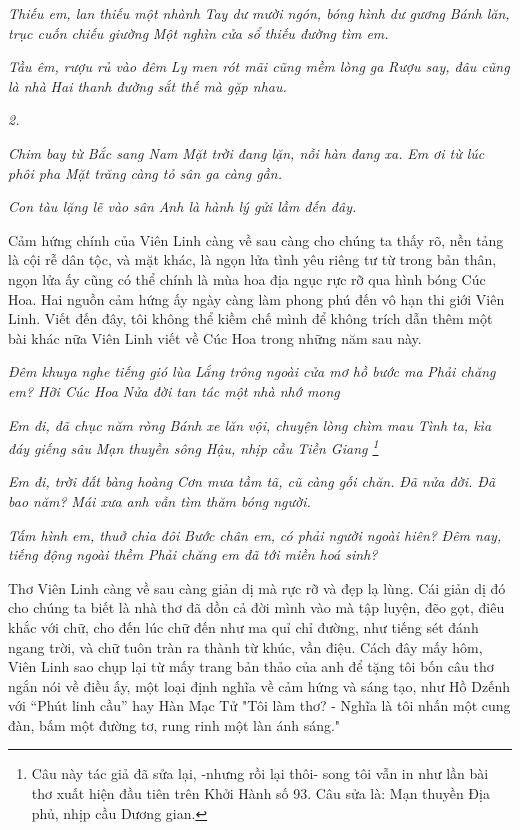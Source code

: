 \documentclass[../main.tex]{subfiles}
\begin{document}
\begin{multicols}{2}
\textit{Thiếu em, lan thiếu một nhành} 
\textit{Tay dư mười ngón, bóng hình dư gương} 
\textit{Bánh lăn, trục cuốn chiếu giường} 
\textit{Một nghìn cửa sổ thiếu đường tìm em.} 

\textit{Tầu êm, rượu rủ vào đêm} 
\textit{Ly men rót mãi cũng mềm lòng ga} 
\textit{Rượu say, đâu cũng là nhà} 
\textit{Hai thanh đường sắt thế mà gặp nhau.} 

\textit{2.} 

\textit{Chim bay từ Bắc sang Nam} 
\textit{Mặt trời đang lặn, nỗi hàn đang xa.} 
\textit{Em ơi từ lúc phôi pha} 
\textit{Mặt trăng càng tỏ sân ga càng gần.} 

\textit{Con tàu lặng lẽ vào sân} 
\textit{Anh là hành lý gửi lầm đến đây.} 

Cảm hứng chính của Viên Linh càng về sau càng cho chúng ta thấy rõ, nền tảng là cội rễ dân tộc, và mặt khác, là ngọn lửa tình yêu riêng tư từ trong bản thân, ngọn lửa ấy cũng có thể chính là mùa hoa địa ngục rực rỡ qua hình bóng Cúc Hoa. Hai nguồn cảm hứng ấy ngày càng làm phong phú đến vô hạn thi giới Viên Linh. Viết đến đây, tôi không thể kiềm chế mình để không trích dẫn thêm một bài khác nữa Viên Linh viết về Cúc Hoa trong những năm sau này. 

\textit{Đêm khuya nghe tiếng gió lùa} 
\textit{Lắng trông ngoài cửa mơ hồ bước ma} 
\textit{Phải chăng em? Hỡi Cúc Hoa} 
\textit{Nửa đời tan tác một nhà nhớ mong} 

\textit{Em đi, đã chục năm ròng} 
\textit{Bánh xe lăn vội, chuyện lòng chìm mau} 
\textit{Tình ta, kìa đáy giếng sâu} 
\textit{Mạn thuyền sông Hậu, nhịp cầu Tiền Giang \footnote{
Câu này tác giả đã sửa lại, -nhưng rồi lại thôi- song tôi vẫn in như lần bài thơ xuất hiện đầu tiên trên Khởi Hành số 93. Câu sửa là: Mạn thuyền Địa phủ, nhịp cầu Dương gian.} }

\textit{Em đi, trời đất bàng hoàng} 
\textit{Cơn mưa tầm tã, cũ càng gối chăn.} 
\textit{Đã nửa đời. Đã bao năm?} 
\textit{Mái xưa anh vẫn tìm thăm bóng người.} 

\textit{Tấm hình em, thuở chia đôi} 
\textit{Bước chân em,} 
\textit{có phải người ngoài hiên?} 
\textit{Đêm nay, tiếng động ngoài thềm} 
\textit{Phải chăng em đã tới miền hoá sinh?} 

Thơ Viên Linh càng về sau càng giản dị mà rực rỡ và đẹp lạ lùng. Cái giản dị đó cho chúng ta biết là nhà thơ đã dồn cả đời mình vào mà tập luyện, đẽo gọt, điêu khắc với chữ, cho đến lúc chữ đến như ma quỉ chỉ đường, như tiếng sét đánh ngang trời, và chữ tuôn tràn ra thành từ khúc, vần điệu. Cách đây mấy hôm, Viên Linh sao chụp lại từ mấy trang bản thảo của anh để tặng tôi bốn câu thơ ngắn nói về điều ấy, một loại định nghĩa về cảm hứng và sáng tạo, như Hồ Dzếnh với “Phút linh cầu” hay Hàn Mạc Tử "Tôi làm thơ? - Nghĩa là tôi nhấn một cung đàn, bấm một đường tơ, rung rinh một làn ánh sáng." 


\end{multicols}
\end{document}
